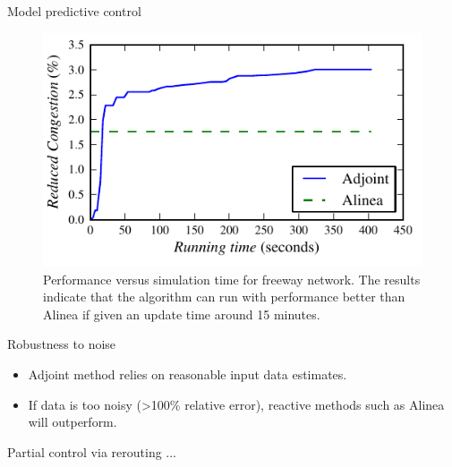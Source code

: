 \begin{frame}{Model predictive control}

\begin{figure}
\begin{centering}
\includegraphics[width=0.8\columnwidth]{../images/longsim}
\par\end{centering}

\caption{Performance versus simulation time for freeway network. The results
indicate that the algorithm can run with performance better than Alinea
if given an update time around 15 minutes.}
\end{figure}

\end{frame}

\begin{frame}{Robustness to noise}

\begin{itemize}
	\item Adjoint method relies on reasonable input data estimates.
	\item If data is too noisy (>100\% relative error), reactive methods such as Alinea will outperform.
\end{itemize}

\begin{figure}
\hfill{}
\end{figure}

\end{frame}

\begin{frame}{Partial control via rerouting}
...
\end{frame}


